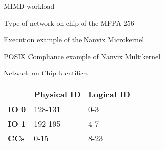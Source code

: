 \begin{backup}

	\begin{frame}[fragile]{MIMD workload}
	\end{frame}

	\begin{frame}[fragile]{Type of network-on-chip of the MPPA-256}
	\end{frame}

	\begin{frame}[fragile]{Execution example of the Nanvix Microkernel}
	\end{frame}

	\begin{frame}[fragile]{POSIX Compliance example of Nanvix Multikernel}
	\end{frame}

	\begin{frame}[fragile]{Network-on-Chip Identifiers}
		\begin{table}
			\centering%
			\begin{tabular}{l|l|l|}
				\cline{2-3}
													& \textbf{Physical ID} & \textbf{Logical ID} \\ \hline
				\multicolumn{1}{|l|}{\textbf{IO 0}} & 128-131              & 0-3                 \\ \hline
				\multicolumn{1}{|l|}{\textbf{IO 1}} & 192-195              & 4-7                 \\ \hline
				\multicolumn{1}{|l|}{\textbf{CCs}}  & 0-15                 & 8-23                \\ \hline
			\end{tabular}
		\end{table}

	\end{frame}


\end{backup}
